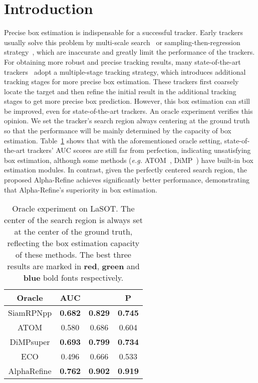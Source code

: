 \documentclass[final]{cvpr}
\begin{document}
\section{Introduction}
Precise box estimation is indispensable for a successful tracker.
Early trackers usually solve this problem by multi-scale search~\cite{SiameseFC,ECO,DRT,unveiling} 
or sampling-then-regression strategy~\cite{SINT,MDNet}, which are inaccurate and greatly limit the performance of the trackers. 
For obtaining more robust and precise tracking results, many state-of-the-art trackers~\cite{SPM,CascadedSiameseRPN,ATOM,DiMP} 
adopt a multiple-stage tracking strategy, which introduces additional tracking stages for more precise box estimation. 
These trackers first coarsely locate the target and then refine the initial result in the additional tracking stages 
to get more precise box prediction.
However, this box estimation can still be improved, even for state-of-the-art trackers.
An oracle experiment verifies this opinion. 
We set the tracker’s search region always centering at the ground truth so that
the performance will be mainly determined by the capacity of box estimation.
Table~\ref{tab:oracle} shows that with the aforementioned oracle setting, state-of-the-art trackers' 
AUC scores are still far from perfection, indicating unsatisfying box estimation, although 
some methods (\emph{e.g.} ATOM~\cite{ATOM}, DiMP~\cite{DiMP}) have built-in box estimation modules. 
In contrast, given the perfectly centered search region, the proposed Alpha-Refine achieves significantly 
better performance, demonstrating that Alpha-Refine's superiority in box estimation.


\begin{table}[!t]
\caption{Oracle experiment on LaSOT. The center of the search region is always set at the center of the ground truth, 
reflecting the box estimation capacity of these methods. The best three results are marked in \textbf{\textcolor[rgb]{1,0,0}{red}}, \textbf{\textcolor[rgb]{0,1,0}{green}} and \textbf{\textcolor[rgb]{0,0,1}{blue}} bold fonts respectively.} 
\vspace{-1mm}
\begin{center}
\begin{tabular}{c|c|c|c}
\hline
\textbf{Oracle} & {\rm AUC} &  & {\rm P} \\
\hline
SiamRPNpp\cite{SiamRPNplus}&\textbf{\textcolor[rgb]{0,0,1}{0.682}}&\textbf{\textcolor[rgb]{0,1,0}{0.829}} & \textbf{\textcolor[rgb]{0,1,0}{0.745}}\\
ATOM\cite{ATOM}&0.580 &0.686 & 0.604  \\
DiMPsuper\cite{DiMP}&\textbf{\textcolor[rgb]{0,1,0}{0.693}}&\textbf{\textcolor[rgb]{0,0,1}{0.799}} & \textbf{\textcolor[rgb]{0,0,1}{0.734}}  \\
ECO\cite{ECO}&0.496&0.666 & 0.533  \\
\hline
AlphaRefine&\textbf{\textcolor[rgb]{1,0,0}{0.762}}&\textbf{\textcolor[rgb]{1,0,0}{0.902}} & \textbf{\textcolor[rgb]{1,0,0}{0.919}}  \\
\hline
\end{tabular}
\end{center}
\label{tab:oracle}
\vspace{-6mm}
\end{table}
\end{document}
